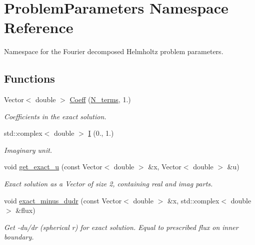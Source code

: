 \hypertarget{namespaceProblemParameters}{}\section{Problem\+Parameters Namespace Reference}
\label{namespaceProblemParameters}


Namespace for the Fourier decomposed Helmholtz problem parameters.  


\subsection*{Functions}
\begin{DoxyCompactItemize}
\item 
Vector$<$ double $>$ \hyperlink{namespaceProblemParameters_acb1788444ef78fe2adec824504f24246}{Coeff} (\hyperlink{namespaceProblemParameters_a6361f0f1c4a120e62d28db64baa84b40}{N\+\_\+terms}, 1.)
\begin{DoxyCompactList}\small\item\em Coefficients in the exact solution. \end{DoxyCompactList}\item 
std\+::complex$<$ double $>$ \hyperlink{namespaceProblemParameters_acfe6a3fe73272672d596ebe2afd0092e}{I} (0., 1.)
\begin{DoxyCompactList}\small\item\em Imaginary unit. \end{DoxyCompactList}\item 
void \hyperlink{namespaceProblemParameters_af750b29069b29bd38b5220ecf534e7f7}{get\+\_\+exact\+\_\+u} (const Vector$<$ double $>$ \&x, Vector$<$ double $>$ \&u)
\begin{DoxyCompactList}\small\item\em Exact solution as a Vector of size 2, containing real and imag parts. \end{DoxyCompactList}\item 
void \hyperlink{namespaceProblemParameters_aa544d1f3e384d3283f7113512931ea8f}{exact\+\_\+minus\+\_\+dudr} (const Vector$<$ double $>$ \&x, std\+::complex$<$ double $>$ \&flux)
\begin{DoxyCompactList}\small\item\em Get -\/du/dr (spherical r) for exact solution. Equal to prescribed flux on inner boundary. \end{DoxyCompactList}\end{DoxyCompactItemize}
